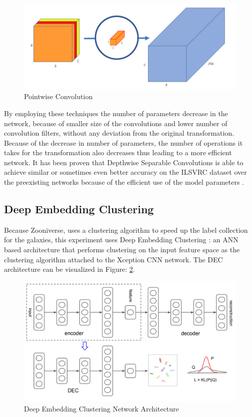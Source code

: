 \documentclass{article}
\begin{document}
\begin{figure}[ht]
\vskip 0.2in
\begin{center}
\centerline{\includegraphics[width=\columnwidth]{figs/pointwise.png}}
\caption{Pointwise Convolution}
\label{figure_pointwise}
\end{center}
\vskip -0.2in
\end{figure}

By employing these techniques the number of parameters decrease in the network, because of smaller size of the convolutions and lower number of convolution filters, without any deviation from the original transformation. Because of the decrease in number of parameters, the number of operations it takes for the transformation also decreases thus leading to a more efficient network. It has been proven that Depthwise Separable Convolutions is able to achieve similar or sometimes even better accuracy on the ILSVRC dataset over the preexisting networks because of the efficient use of the model parameters \cite{xception}.


\subsection{Deep Embedding Clustering}
Because Zooniverse, uses a clustering algorithm to speed up the label collection for the galaxies, this experiment uses Deep Embedding Clustering \cite{dec}: an ANN based architecture that performs clustering on the input feature space as the clustering algorithm attached to the Xception CNN network. The DEC architecture can be visualized in Figure: \ref{figure_dec}. 

\begin{figure}[ht]
\vskip 0.2in
\begin{center}
\centerline{\includegraphics[width=\columnwidth]{figs/dec.png}}
\caption{Deep Embedding Clustering Network Architecture}
\label{figure_dec}
\end{center}
\vskip -0.2in
\end{figure}
\end{document}
